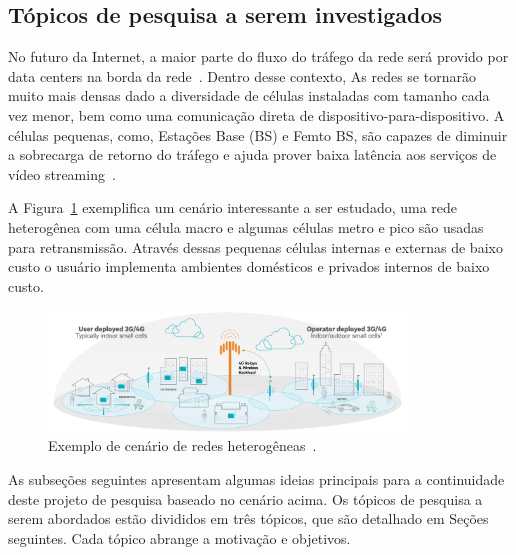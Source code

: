 \subsection{Tópicos de pesquisa a serem investigados}
\label{ch:proposal}
No futuro da Internet, a maior parte do fluxo do tráfego da rede será provido por data centers na borda da rede~\cite{cisco:forecast2017}.
Dentro desse contexto, 
As redes se tornarão muito mais densas dado a diversidade de células instaladas com tamanho cada vez menor, bem como uma comunicação direta de dispositivo-para-dispositivo. A células pequenas, como, Estações Base (BS) e Femto BS,
são capazes %
de diminuir a sobrecarga de retorno do tráfego e ajuda prover baixa latência aos serviços de vídeo streaming~\cite{guan:2019:CLC}.

A Figura~\ref{fig:scenario-ex-lte-wifi} exemplifica um cenário interessante a ser estudado, uma rede heterogênea com uma célula macro e algumas células metro e pico são usadas para retransmissão. Através dessas pequenas células internas e externas de baixo custo o usuário implementa ambientes domésticos e privados internos de baixo custo.

\vspace{0.8cm}
\begin{figure}[htpb]
	\centering
	\includegraphics[width=0.85\textwidth]{img/hetnet-lte-wifi-v2.png}
	\caption{Exemplo de cenário de redes heterogêneas~\cite{Qualcomm2013}.}
	\label{fig:scenario-ex-lte-wifi}
\end{figure}

As subseções seguintes apresentam algumas ideias principais para a continuidade deste projeto de pesquisa baseado no cenário acima. Os tópicos de pesquisa a serem abordados estão divididos em três tópicos, que são
detalhado em Seções seguintes. Cada tópico abrange a motivação e objetivos.

